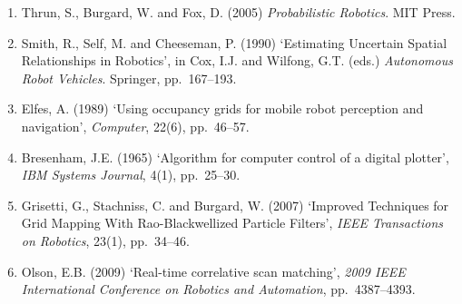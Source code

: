 \documentclass[12pt,a4paper]{article}
\begin{document}
\begin{enumerate}
    \item Thrun, S., Burgard, W. and Fox, D. (2005) \emph{Probabilistic Robotics}. MIT Press.
    \item Smith, R., Self, M. and Cheeseman, P. (1990) `Estimating Uncertain Spatial Relationships in Robotics', in Cox, I.J. and Wilfong, G.T. (eds.) \emph{Autonomous Robot Vehicles}. Springer, pp.~167--193.
    \item Elfes, A. (1989) `Using occupancy grids for mobile robot perception and navigation', \emph{Computer}, 22(6), pp.~46--57.
    \item Bresenham, J.E. (1965) `Algorithm for computer control of a digital plotter', \emph{IBM Systems Journal}, 4(1), pp.~25--30.
    \item Grisetti, G., Stachniss, C. and Burgard, W. (2007) `Improved Techniques for Grid Mapping With Rao-Blackwellized Particle Filters', \emph{IEEE Transactions on Robotics}, 23(1), pp.~34--46.
    \item Olson, E.B. (2009) `Real-time correlative scan matching', \emph{2009 IEEE International Conference on Robotics and Automation}, pp.~4387--4393.
\end{enumerate}
\end{document}
